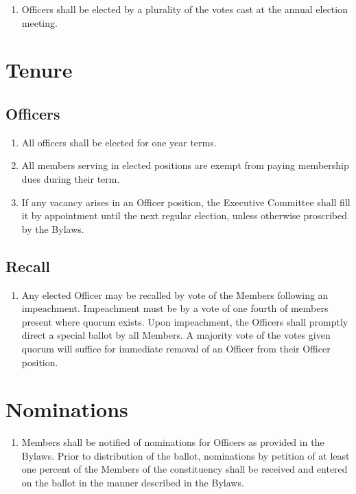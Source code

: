 \documentclass[12pt,letterpaper]{article}
\begin{document}
\begin{enumerate}
  \item Officers shall be elected by a plurality of the votes cast at the annual
        election meeting.
\end{enumerate}

\section{Tenure}

\subsection{Officers}
\begin{enumerate}
  \item All officers shall be elected for one year terms.
  \item All members serving in elected positions are exempt from paying membership
        dues during their term.
  \item If any vacancy arises in an Officer position, the Executive Committee shall
        fill it by appointment until the next regular election, unless otherwise
        proscribed by the Bylaws.
\end{enumerate}

\subsection{Recall}
\begin{enumerate}
  \item Any elected Officer may be recalled by vote of the Members following an
        impeachment. Impeachment must be by a vote of one fourth of members present
        where quorum exists. Upon impeachment, the Officers shall promptly direct a
        special ballot by all Members. A majority vote of the votes given quorum will
        suffice for immediate removal of an Officer from their Officer position.
\end{enumerate}

\section{Nominations}
\begin{enumerate}
  \item Members shall be notified of nominations for Officers as provided in the
        Bylaws. Prior to distribution of the ballot, nominations by petition of at
        least one percent of the Members of the constituency shall be received and
        entered on the ballot in the manner described in the Bylaws.
\end{enumerate}
\end{document}
